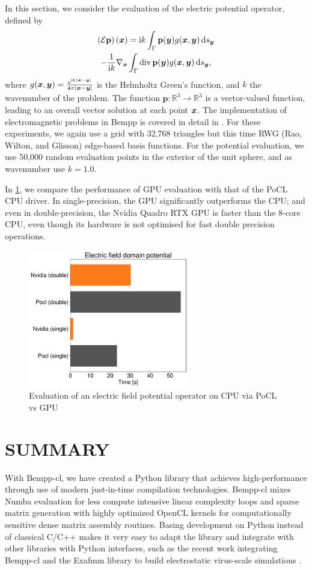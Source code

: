 In this section, we consider the evaluation of the electric potential operator, defined by
\begin{multline}
\left(\mathcal{E}\mathbf{p}\right)(\bx) = \ii k\int_{\Gamma}\mathbf{p}(\by)g(\bx, \by) \ds[\by]\\
-\frac{1}{\ii k}\nabla_{\bx}\int_{\Gamma}\operatorname{div}\mathbf{p}(\by)g(\bx, \by)\ds[\by],
\end{multline}
where $g(\boldsymbol{x}, \boldsymbol{y}) = \frac{\mathrm{e}^{\mathrm{i} k|\boldsymbol{x} - \boldsymbol{y}|}}{4\pi|\boldsymbol{x} - \boldsymbol{y}|}$ is the Helmholtz Green's function, and
$k$ the wavenumber of the problem.
The function $\mathbf{p}:\mathbb{R}^3\to\mathbb{R}^3$ is a vector-valued function, leading to an overall vector solution at each point $\boldsymbol{x}$. The implementation of electromagnetic problems in Bempp is covered in detail in \cite{bempp_maxwell}. For these experiments, we again use a grid with 32,768 triangles but this time RWG (Rao, Wilton, and Glisson) edge-based basis functions. For the potential evaluation, we use 50,000 random evaluation points in the exterior of the unit sphere, and as wavenumber use $k=1.0$.

In \cref{fig:efield_domain_potential}, we compare the performance of GPU evaluation with that of the PoCL CPU driver. In single-precision, the GPU significantly outperforms the CPU; and even in double-precision, the Nvidia Quadro RTX GPU is faster than the 8-core CPU, even though its hardware is not optimised for fast double precision operations.

\begin{figure}
	\center
	\includegraphics[width=7cm]{img/efield_domain_potential.pdf}
	\caption{Evaluation of an electric field potential operator on CPU via PoCL vs GPU}
	\label{fig:efield_domain_potential}
\end{figure}

\section{SUMMARY}
With Bempp-cl, we have created a Python library that achieves high-performance through use of modern just-in-time compilation technologies. Bempp-cl mixes Numba evaluation for less compute intensive linear complexity loops and sparse matrix generation with highly optimized OpenCL kernels for computationally sensitive dense matrix assembly routines. Basing development on Python instead of classical C/C++ makes it very easy to adapt the library and integrate with other libraries with Python interfaces, such as the recent work integrating Bempp-cl and the Exafmm library to build electrostatic virus-scale simulations \cite{bempp_exafmm}.

